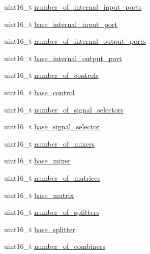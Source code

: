 \begin{DoxyCompactItemize}
\item 
uint16\+\_\+t \hyperlink{structjdksavdecc__descriptor__audio__unit_af14e1056175671f086901f07420bf46f}{number\+\_\+of\+\_\+internal\+\_\+input\+\_\+ports}
\item 
uint16\+\_\+t \hyperlink{structjdksavdecc__descriptor__audio__unit_a11d926248b31db1ff60e6416c9c3d996}{base\+\_\+internal\+\_\+input\+\_\+port}
\item 
uint16\+\_\+t \hyperlink{structjdksavdecc__descriptor__audio__unit_aeba303ee329974d2a1c3ff9b5b41ed4b}{number\+\_\+of\+\_\+internal\+\_\+output\+\_\+ports}
\item 
uint16\+\_\+t \hyperlink{structjdksavdecc__descriptor__audio__unit_a238f1b0f1c8556b5e9586d93541169a5}{base\+\_\+internal\+\_\+output\+\_\+port}
\item 
uint16\+\_\+t \hyperlink{structjdksavdecc__descriptor__audio__unit_a0104bea638bdadf1a547c2b93813e22f}{number\+\_\+of\+\_\+controls}
\item 
uint16\+\_\+t \hyperlink{structjdksavdecc__descriptor__audio__unit_af06eac7dd98377a85258308e8a25e7f2}{base\+\_\+control}
\item 
uint16\+\_\+t \hyperlink{structjdksavdecc__descriptor__audio__unit_af062758f302e01b8b7b7bd84cdb15806}{number\+\_\+of\+\_\+signal\+\_\+selectors}
\item 
uint16\+\_\+t \hyperlink{structjdksavdecc__descriptor__audio__unit_a5bd998af8a76ae1336006ec16829b64d}{base\+\_\+signal\+\_\+selector}
\item 
uint16\+\_\+t \hyperlink{structjdksavdecc__descriptor__audio__unit_a6d06803f27b9635d1fb276aa4d4a070b}{number\+\_\+of\+\_\+mixers}
\item 
uint16\+\_\+t \hyperlink{structjdksavdecc__descriptor__audio__unit_ad2cbeba461f7e25ffee9118ab1343ee0}{base\+\_\+mixer}
\item 
uint16\+\_\+t \hyperlink{structjdksavdecc__descriptor__audio__unit_a0c19f1b0409a0cdaaf557f4a7a717260}{number\+\_\+of\+\_\+matrices}
\item 
uint16\+\_\+t \hyperlink{structjdksavdecc__descriptor__audio__unit_a4faf17fd3b3d91f6b24fe8d66a042309}{base\+\_\+matrix}
\item 
uint16\+\_\+t \hyperlink{structjdksavdecc__descriptor__audio__unit_a3b40548ad0ea8b330660dcee0de42db7}{number\+\_\+of\+\_\+splitters}
\item 
uint16\+\_\+t \hyperlink{structjdksavdecc__descriptor__audio__unit_a7a10a93a209406b90273d791f69a4421}{base\+\_\+splitter}
\item 
uint16\+\_\+t \hyperlink{structjdksavdecc__descriptor__audio__unit_afbc32f9432e80e58a019b1be2388cf66}{number\+\_\+of\+\_\+combiners}

\end{DoxyCompactItemize}
